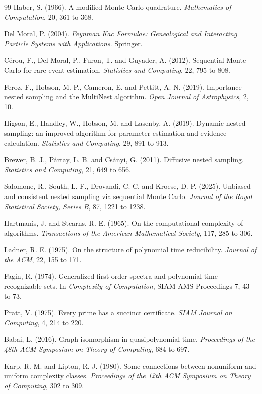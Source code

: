 \documentclass[11pt,twoside,openany]{book}
\theoremstyle{plain}
\theoremstyle{definition}
\theoremstyle{remark}
\begin{document}
\begin{thebibliography}{99}
 Haber, S. (1966). A modified Monte Carlo quadrature. \emph{Mathematics of Computation}, 20, 361 to 368.

 Del Moral, P. (2004). \emph{Feynman Kac Formulae: Genealogical and Interacting Particle Systems with Applications}. Springer.

 C\'erou, F., Del Moral, P., Furon, T. and Guyader, A. (2012). Sequential Monte Carlo for rare event estimation. \emph{Statistics and Computing}, 22, 795 to 808.

 Feroz, F., Hobson, M. P., Cameron, E. and Pettitt, A. N. (2019). Importance nested sampling and the MultiNest algorithm. \emph{Open Journal of Astrophysics}, 2, 10.

 Higson, E., Handley, W., Hobson, M. and Lasenby, A. (2019). Dynamic nested sampling: an improved algorithm for parameter estimation and evidence calculation. \emph{Statistics and Computing}, 29, 891 to 913.

 Brewer, B. J., P\'artay, L. B. and Cs\'anyi, G. (2011). Diffusive nested sampling. \emph{Statistics and Computing}, 21, 649 to 656.

 Salomone, R., South, L. F., Drovandi, C. C. and Kroese, D. P. (2025). Unbiased and consistent nested sampling via sequential Monte Carlo. \emph{Journal of the Royal Statistical Society, Series B}, 87, 1221 to 1238.

 Hartmanis, J. and Stearns, R. E. (1965). On the computational complexity of algorithms. \emph{Transactions of the American Mathematical Society}, 117, 285 to 306.

 Ladner, R. E. (1975). On the structure of polynomial time reducibility. \emph{Journal of the ACM}, 22, 155 to 171.

 Fagin, R. (1974). Generalized first order spectra and polynomial time recognizable sets. In \emph{Complexity of Computation}, SIAM AMS Proceedings 7, 43 to 73.

 Pratt, V. (1975). Every prime has a succinct certificate. \emph{SIAM Journal on Computing}, 4, 214 to 220.

 Babai, L. (2016). Graph isomorphism in quasipolynomial time. \emph{Proceedings of the 48th ACM Symposium on Theory of Computing}, 684 to 697.

 Karp, R. M. and Lipton, R. J. (1980). Some connections between nonuniform and uniform complexity classes. \emph{Proceedings of the 12th ACM Symposium on Theory of Computing}, 302 to 309.


\end{thebibliography}
\end{document}
